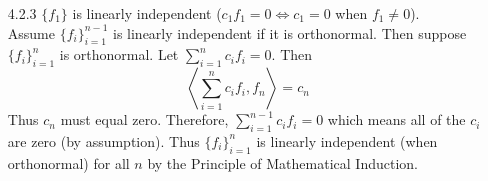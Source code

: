 \documentclass[../../Solutions.tex]{subfiles}
\begin{document}
\begin{itemize}
	\item [4.2.3] $\{f_1\}$ is linearly independent ($c_1f_1 = 0 \iff c_1 = 0$ when $f_1 \neq 0$). \\
		Assume $\{f_i\}_{i=1}^{n-1}$ is linearly independent if it is orthonormal.
		Then suppose $\{f_i\}_{i=1}^n$ is orthonormal.
		Let $\sum_{i=1}^n c_if_i = 0$. Then
		$$ \left\langle \sum_{i=1}^n c_i f_i , f_n \right\rangle = c_n $$
		Thus $c_n$ must equal zero.
		Therefore, $\sum_{i=1}^{n-1} c_if_i = 0$ which means all of the $c_i$ are zero (by assumption).
		Thus $\{f_i\}_{i=1}^n$ is linearly independent (when orthonormal) for all $n$ by the Principle of Mathematical Induction.

\end{itemize}
\end{document}

